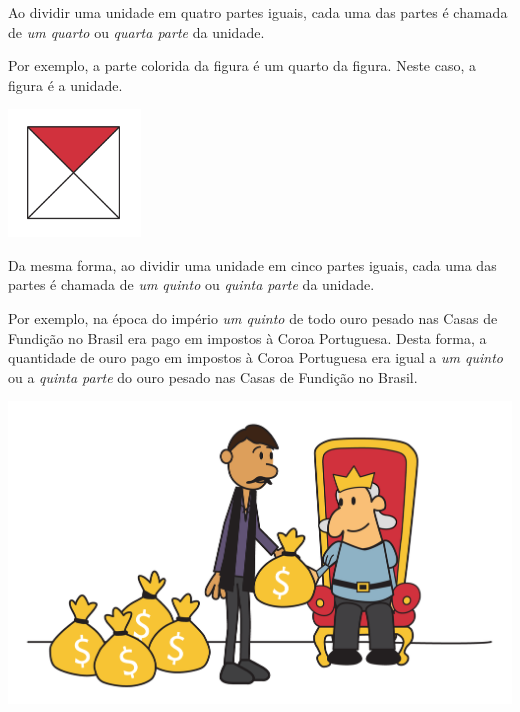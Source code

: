 Ao dividir uma unidade em quatro partes iguais, cada uma das partes é chamada de \textit{um quarto} ou \textit{quarta parte} da unidade.

Por exemplo, a parte colorida da figura é um quarto da figura. Neste caso, a figura é a unidade.

\begin{center}
    \includegraphics[width=100pt, keepaspectratio]{../figuras/licao01/orgideias_fig04.png}
  \end{center}
Da mesma forma, ao dividir uma unidade em cinco partes iguais, cada uma das partes é chamada de \textit{um quinto} ou \textit{quinta parte} da unidade.

Por exemplo, na época do império \emph{um quinto} de todo ouro pesado nas Casas de Fundição no Brasil era pago em impostos à Coroa Portuguesa. Desta forma, a quantidade de ouro pago em impostos à Coroa Portuguesa era igual a \emph{um quinto} ou a \emph{quinta parte} do ouro pesado nas Casas de Fundição no Brasil.

\begin{center}
    \includegraphics[width=400pt, keepaspectratio]{../figuras/licao01/orgideias_fig05.png}
  \end{center}


   
